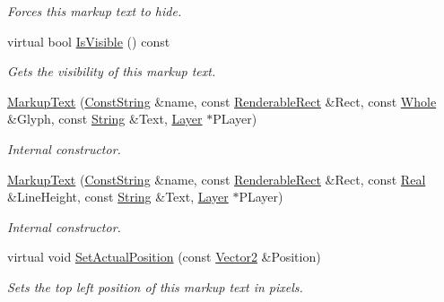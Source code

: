 \begin{DoxyCompactItemize}
\begin{DoxyCompactList}\small\item\em Forces this markup text to hide. \item\end{DoxyCompactList}\item 
virtual bool \hyperlink{classMezzanine_1_1UI_1_1MarkupText_a7cbd2c77fa2a1da3845d72b030c104ae}{IsVisible} () const 
\begin{DoxyCompactList}\small\item\em Gets the visibility of this markup text. \item\end{DoxyCompactList}\item 
\hyperlink{classMezzanine_1_1UI_1_1MarkupText_a6cb716e035363adc93f2213b74c8fcb2}{MarkupText} (\hyperlink{namespaceMezzanine_a63cd699ac54b73953f35ec9cfc05e506}{ConstString} \&name, const \hyperlink{structMezzanine_1_1UI_1_1RenderableRect}{RenderableRect} \&Rect, const \hyperlink{namespaceMezzanine_adcbb6ce6d1eb4379d109e51171e2e493}{Whole} \&Glyph, const \hyperlink{namespaceMezzanine_acf9fcc130e6ebf08e3d8491aebcf1c86}{String} \&Text, \hyperlink{classMezzanine_1_1UI_1_1Layer}{Layer} $\ast$PLayer)
\begin{DoxyCompactList}\small\item\em Internal constructor. \item\end{DoxyCompactList}\item 
\hyperlink{classMezzanine_1_1UI_1_1MarkupText_a98467ecf78d53e9497cb6aeb0da27edd}{MarkupText} (\hyperlink{namespaceMezzanine_a63cd699ac54b73953f35ec9cfc05e506}{ConstString} \&name, const \hyperlink{structMezzanine_1_1UI_1_1RenderableRect}{RenderableRect} \&Rect, const \hyperlink{namespaceMezzanine_a726731b1a7df72bf3583e4a97282c6f6}{Real} \&LineHeight, const \hyperlink{namespaceMezzanine_acf9fcc130e6ebf08e3d8491aebcf1c86}{String} \&Text, \hyperlink{classMezzanine_1_1UI_1_1Layer}{Layer} $\ast$PLayer)
\begin{DoxyCompactList}\small\item\em Internal constructor. \item\end{DoxyCompactList}\item 
virtual void \hyperlink{classMezzanine_1_1UI_1_1MarkupText_a1050bf980ccf62f5688611cfb07d7155}{SetActualPosition} (const \hyperlink{classMezzanine_1_1Vector2}{Vector2} \&Position)
\begin{DoxyCompactList}\small\item\em Sets the top left position of this markup text in pixels. \item\end{DoxyCompactList}\item 

\end{DoxyCompactItemize}
